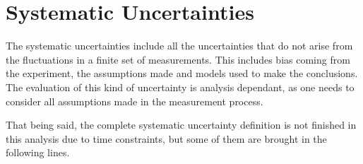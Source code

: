 \section{Systematic Uncertainties}

The systematic uncertainties include all the uncertainties that do not arise from the fluctuations in a finite set of measurements. This includes bias coming from the experiment, the assumptions made and models used to make the conclusions. The evaluation of this kind of uncertainty is analysis dependant, as one needs to consider all assumptions made in the measurement process.

That being said, the complete systematic uncertainty definition is not finished in this analysis due to time constraints, but some of them are brought in the following lines.

